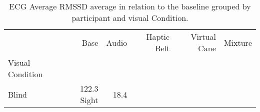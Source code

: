 
\begin{table}[!htb]
\centering
\caption{ECG Average RMSSD average in relation to the baseline grouped by participant and visual Condition.}
\label{tab:ecg_rmssd_average_group}
\begin{tabular}{lrrrrr}
\toprule
{} &    Base &   Audio & Haptic Belt & Virtual Cane & Mixture \\
Visual Condition &         &         &             &              &         \\
\midrule
Blind            &  122.3%
Sight            &   18.4%
\bottomrule
\end{tabular}
\end{table}

